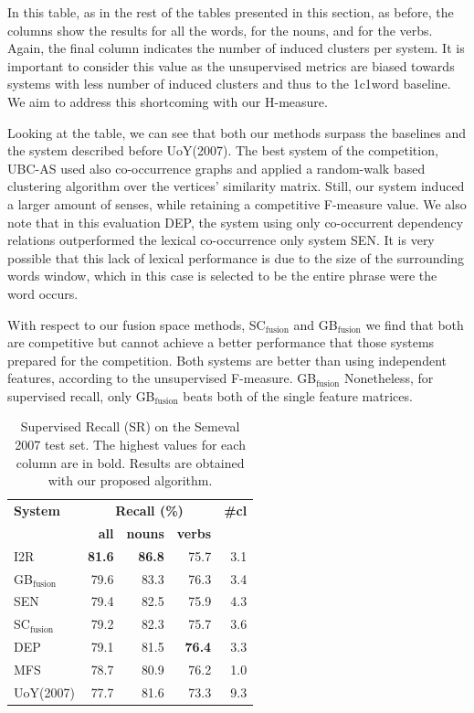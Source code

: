 In this table, as in the rest of the tables presented in this section, as before, the columns show the results for all the words, for the nouns, and for the verbs. Again, the final column indicates the number of induced clusters per system. It is important to consider this value as the unsupervised metrics are biased towards systems with less number of induced clusters and thus to the 1c1word baseline. We aim to address this shortcoming with our H-measure.

Looking at the table, we can see that both our methods surpass the baselines and the system described before {UoY(2007)}. The best system of the competition, {UBC-AS} used also co-occurrence graphs and applied a random-walk based clustering algorithm over the vertices' similarity matrix. Still, our system induced a larger amount of senses, while retaining a competitive F-measure value. We also note that in this evaluation DEP, the system using only co-occurrent dependency relations outperformed the lexical co-occurrence only system SEN. It is very possible that this lack of lexical performance is due to the size of the surrounding words window, which in this case is selected to be the entire phrase were the word occurs. 

With respect to our fusion space methods, SC$_{\text{fusion}}$ and GB$_{\text{fusion}}$ we find that both are competitive but cannot achieve a better performance that those systems prepared for the competition. Both systems are better than using independent features, according to the unsupervised F-measure. GB$_{\text{fusion}}$  Nonetheless, for supervised recall, only GB$_{\text{fusion}}$ beats both of the single feature matrices.


\begin{table}[!tb]
\centering
\caption{Supervised Recall (SR) on the Semeval 2007 test set. The highest values for each column are in bold. Results are obtained with our proposed algorithm.}
\begin{tabular}{@{}lrrrr@{}}
\toprule
\textbf{System} & \multicolumn{3}{c}{\textbf{Recall (\%)}} & \textbf{\#cl} \\
 & \textbf{all} & \textbf{nouns} & \textbf{verbs} & \\ \midrule
I2R & \textbf{81.6} & \textbf{86.8} & 75.7 & 3.1 \\
GB$_{\text{fusion}}$ & 79.6 & 83.3 & {76.3} & 3.4 \\
SEN & 79.4 & 82.5 & 75.9 & 4.3 \\
SC$_{\text{fusion}}$ & 79.2 & 82.3 & 75.7 & 3.6\\
DEP & 79.1 & 81.5 & \textbf{76.4} & 3.3\\
MFS & 78.7 & 80.9 & 76.2 & 1.0 \\
UoY(2007) & 77.7 & 81.6 & 73.3 & 9.3 \\ \bottomrule
\end{tabular}

\label{tab:sem2007_sup_recall}
\end{table}

